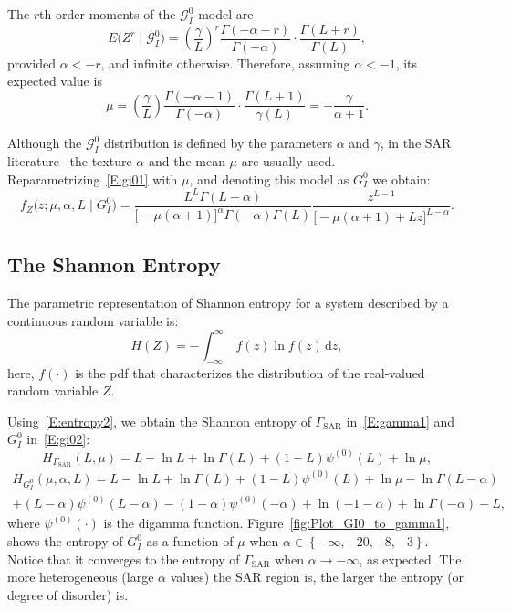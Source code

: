 \documentclass[remotesensing,article,submit,moreauthors,pdftex]{Definitions/mdpi}
\begin{document}
The \(r\)th order moments of the \(\mathcal{G}_I^0\) model are
\begin{equation}
E\big(Z^r\mid \mathcal{G}_I^0\big)  = \left(\frac{\gamma}{L}\right)^r\frac{\Gamma(-\alpha-r)}{\Gamma(-\alpha)}\cdot\frac{\Gamma(L+r)}{\Gamma(L)}, 
    \label{E:rmom}
\end{equation} provided \(\alpha <-r\), and infinite otherwise.
Therefore, assuming \(\alpha<-1\), its expected value is
\begin{equation}
    \mu=\left(\frac{\gamma}{L}\right)\frac{\Gamma(-\alpha-1)}{\Gamma(-\alpha)}\cdot\frac{\Gamma(L+1)}{\gamma(L)}=-\frac{\gamma}{\alpha+1}.
\end{equation}

Although the \(\mathcal{G}_I^0\) distribution is defined by the
parameters \(\alpha\) and \(\gamma\), in the SAR
literature~\cite{Nascimento2010} the texture \(\alpha\) and the mean
\(\mu\) are usually used. Reparametrizing~\eqref{E:gi01} with \(\mu\),
and denoting this model as \(G_I^0\) we obtain: \begin{equation}
        f_Z\big(z; \mu, \alpha, L\mid G_I^0\big) = \frac{L^L\Gamma(L-\alpha)}{\big[-\mu(\alpha+1)\big]^{\alpha}\Gamma(-\alpha)\Gamma(L)} \frac{z^{L-1}}{\big[-\mu(\alpha+1)+Lz\big]^{L-\alpha}}.\label{E:gi02}
\end{equation}

\subsection{The Shannon Entropy}\label{the-shannon-entropy}

The parametric representation of Shannon entropy for a system described
by a continuous random variable is: \begin{equation}
  \label{E:entropy2}
  H(Z)=-\int_{-\infty }^\infty \ f(z)\ln f(z)\, \mathrm{d}z,
\end{equation} here, \(f(\cdot)\) is the pdf that characterizes the
distribution of the real-valued random variable \(Z\).

Using~\eqref{E:entropy2}, we obtain the Shannon entropy of
\(\Gamma_{\text{SAR}}\) in~\eqref{E:gamma1} and \(G_I^0\)
in~\eqref{E:gi02}: \begin{equation}
\label{E:E-gamma}
H_{\Gamma_{\text{SAR}}}(L, \mu) =   L -\ln L+\ln\Gamma(L)+(1-L)\psi^{(0)}(L) + \ln \mu, 
\end{equation} \begin{multline}
\label{E:E-GIO}
H_{G_I^0}(\mu, \alpha, L) =L -\ln L+\ln\Gamma(L)+(1-L)\psi^{(0)}(L) +\ln \mu -\ln\Gamma(L-\alpha)\\
+ (L-\alpha) \psi^{(0)}(L-\alpha)-(1-\alpha)\psi^{(0)}(-\alpha)+\ln (-1-\alpha)+\ln\Gamma(-\alpha)-L,
\end{multline} where \(\psi^{(0)}(\cdot)\) is the digamma function.
Figure~\ref{fig:Plot_GI0_to_gamma1}, shows the entropy of \(G_I^0\) as a
function of \(\mu\) when
\(\alpha \in \left\{-\infty, -20, -8, -3\right\}\). Notice that it
converges to the entropy of \(\Gamma_{\text{SAR}}\) when
\(\alpha\to-\infty\), as expected. The more heterogeneous (large
\(\alpha\) values) the SAR region is, the larger the entropy (or degree
of disorder) is.
\end{document}
